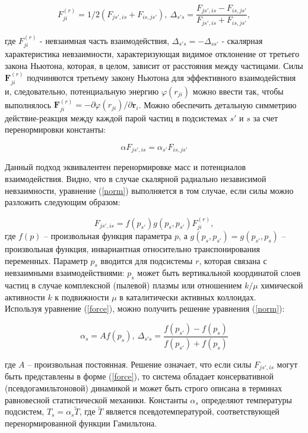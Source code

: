 \begin{equation}\label{third}
    F^{(r)}_{ji} = 1/2(F_{js',is} + F_{is, js'}), ~\Delta_{s's} = \frac{F_{js',is} - F_{is, js'}}{F_{js',is} + F_{is, js'}},
\end{equation}


где $F^{(r)}_{ji}$ - невзаимная часть взаимодействия,  $\Delta_{s's} = - \Delta_{ss'}$ - скалярная характеристика невзаимности, характеризующая видимое отклонение от третьего закона Ньютона, которая, в целом, зависит от расстояния между частицами. Силы $\textbf{F}^{(r)}_{ji}$ подчиняются третьему закону Ньютона для эффективного
взаимодействия и, следовательно, потенциальную энергию $\varphi(r_{ji})$ можно ввести так, чтобы выполнялось $\textbf{F}^{(r)}_{ji} = -\partial \varphi(r_{ji})/\partial \textbf{r}_i$. Можно обеспечить детальную симметрию действие-реакция между каждой парой частиц в подсистемах $s'$ и $s$ за счет перенормировки константы:

\begin{equation}\label{norm}
    \alpha F_{js',is} = \alpha_{s'} F_{is, js'}
\end{equation}


Данный подход эквивалентен перенормировке масс и потенциалов взаимодействия.
Видно, что в случае скалярной радиально независимой
невзаимности, уравнение (\ref{norm}) выполняется в том случае, если силы можно разложить следующим образом:

\begin{equation}\label{force}
    F_{js', is} = f(p_{s'}) g(p_{s}, p_{s'}) F_{ji}^{(r)},
\end{equation}
где $f(p)$ -- произвольная функция параметра $p$,
а $g(p_s, p_{s'}) = g(p_{s'}, p_s)$ 
-- произвольная функция, инвариантная относительно
транспонирования переменных. Параметр $p_s$ вводится для подсистемы $r$, которая связана с невзаимными взаимодействиями: $p_s$ может быть вертикальной координатой слоев частиц
в случае комплексной (пылевой) плазмы или отношением $k/\mu$ химической активности $k$ к подвижности $\mu$ в каталитически активных коллоидах.\\

Используя уравнение (\ref{force}), можно получить решение уравнения (\ref{norm}):

\begin{equation}\label{sixth}
    \alpha_s = A f(p_s), ~\Delta_{s's} = \frac{f(p_{s'}) - f(p_s)}{f(p_{s'}) + f(p_s)}
\end{equation}

где $A$ -- произвольная постоянная. 
Решение означает, что если силы $F_{js',is}$
могут быть представлены
в форме (\ref{force}), то система обладает консервативной (псевдогамильтоновой) динамикой и может быть строго описана в терминах
равновесной статистической механики. Константы $\alpha_s$ определяют температуры подсистем, $T_s  = \alpha_s \widetilde{T}$, где $\widetilde{T}$
является псевдотемпературой, соответствующей перенормированной функции Гамильтона.\\




